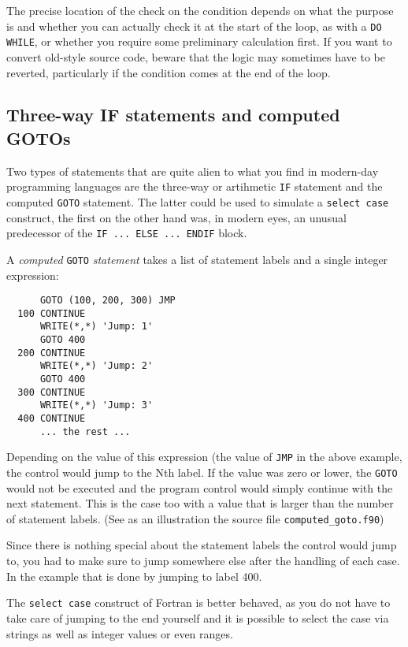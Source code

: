 The precise location of the check on the condition depends on what the purpose is and
whether you can actually check it at the start of the loop, as with a \verb+DO WHILE+,
or whether you require some preliminary calculation first. If you want to convert
old-style source code, beware that the logic may sometimes have to be reverted,
particularly if the condition comes at the end of the loop.


\subsection{Three-way IF statements and computed GOTOs}
Two types of statements that are quite alien to what you find in modern-day programming
languages are the three-way or artihmetic \verb+IF+ statement and the computed \verb+GOTO+ statement.
The latter could be used to simulate a \verb+select case+ construct, the first on the
other hand was, in modern eyes, an unusual predecessor of the \verb+IF ... ELSE ... ENDIF+
block.

A \emph{computed} \verb+GOTO+ \emph{statement} takes a list of statement labels and a single integer expression:
%
\begin{verbatim}
      GOTO (100, 200, 300) JMP
  100 CONTINUE
      WRITE(*,*) 'Jump: 1'
      GOTO 400
  200 CONTINUE
      WRITE(*,*) 'Jump: 2'
      GOTO 400
  300 CONTINUE
      WRITE(*,*) 'Jump: 3'
  400 CONTINUE
      ... the rest ...
\end{verbatim}
%
Depending on the value of this expression (the value of \verb+JMP+ in the above example,
the control would jump to the Nth label. If the value was zero or lower, the \verb+GOTO+
would not be executed and the program control would simply continue with the next statement.
This is the case too with a value that is larger than the number of statement labels.
(See as an illustration the source file \verb+computed_goto.f90+)

Since there is nothing special about the statement labels the control would jump to, you had
to make sure to jump somewhere else after the handling of each case. In the example that
is done by jumping to label 400.

The \verb+select case+ construct of Fortran is better behaved, as you do not have to
take care of jumping to the end yourself and it is possible to select the case via strings
as well as integer values or even ranges.

